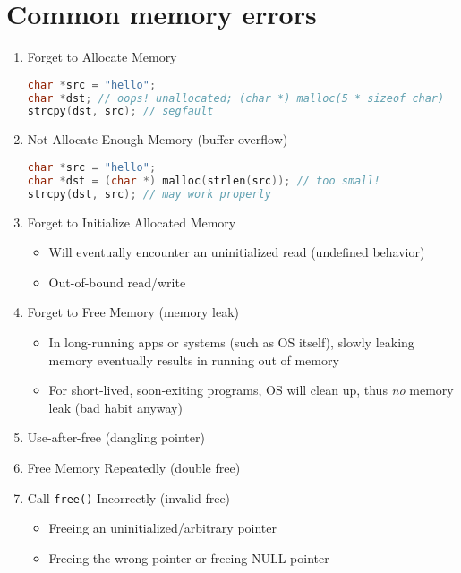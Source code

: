 \section*{Common memory errors}
\begin{enumerate}
\item Forget to Allocate Memory
  \begin{lstlisting}[language=c,xrightmargin=2pt]
char *src = "hello";
char *dst; // oops! unallocated; (char *) malloc(5 * sizeof char)
strcpy(dst, src); // segfault
\end{lstlisting}

\item Not Allocate Enough Memory (buffer overflow)
\begin{lstlisting}[language=c,xrightmargin=2pt]
char *src = "hello";
char *dst = (char *) malloc(strlen(src)); // too small!
strcpy(dst, src); // may work properly
\end{lstlisting}

\item Forget to Initialize Allocated Memory
  \begin{itemize}
  \item Will eventually encounter an uninitialized read (undefined behavior)
  \item Out-of-bound read/write
  \end{itemize}

\item Forget to Free Memory (memory leak)
  \begin{itemize}
  \item In long-running apps or systems (such as OS itself), slowly leaking memory eventually results in running out of memory
  \item For short-lived, soon-exiting programs, OS will clean up, thus \emph{no} memory leak (bad habit anyway)
  \end{itemize}

\item Use-after-free (dangling pointer)
\item Free Memory Repeatedly (double free)
\item Call \texttt{free()} Incorrectly (invalid free)
  \begin{itemize}
  \item Freeing an uninitialized/arbitrary pointer
  \item Freeing the wrong pointer or freeing NULL pointer
  \end{itemize}
\end{enumerate}
